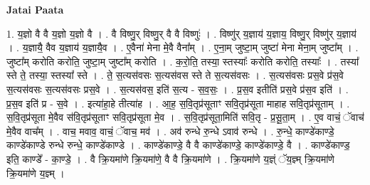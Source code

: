 \documentclass[17pt]{extarticle}
\begin{document}
\textbf{Jatai Paata} \newline

1. य॒ज्ञो वै वै य॒ज्ञो य॒ज्ञो वै । . वै विष्णु॒र् विष्णु॒र् वै वै विष्णुः॑ । . विष्णु॑र् य॒ज्ञाय॑ य॒ज्ञाय॒ विष्णु॒र् विष्णु॑र् य॒ज्ञाय॑ । . य॒ज्ञायै॒ वैव य॒ज्ञाय॑ य॒ज्ञायै॒व । . ए॒वैना॑ मेना मे॒वै वैना᳚म् । . ए॒ना॒म् जुष्टा॒म् जुष्टा॑ मेना मेना॒म् जुष्टा᳚म् । . जुष्टा᳚म् करोति करोति॒ जुष्टा॒म् जुष्टा᳚म् करोति । . क॒रो॒ति॒ तस्या॒ स्तस्याः᳚ करोति करोति॒ तस्याः᳚ । . तस्या᳚ स्ते ते॒ तस्या॒ स्तस्या᳚ स्ते । . ते॒ स॒त्यस॑वसः स॒त्यस॑वस स्ते ते स॒त्यस॑वसः । . स॒त्यस॑वसः प्रस॒वे प्र॑स॒वे स॒त्यस॑वसः स॒त्यस॑वसः प्रस॒वे । . स॒त्यस॑वस॒ इति॑ स॒त्य - स॒व॒सः॒ । . प्र॒स॒व इतीति॑ प्रस॒वे प्र॑स॒व इति॑ । . प्र॒स॒व इति॑ प्र - स॒वे । . इत्या॑हा॒हे तीत्या॑ह । . आ॒ह॒ स॒वि॒तृप्र॑सूताꣳ सवि॒तृप्र॑सूता माहाह सवि॒तृप्र॑सूताम् । . स॒वि॒तृप्र॑सूता मे॒वैव स॑वि॒तृप्र॑सूताꣳ सवि॒तृप्र॑सूता मे॒व । . स॒वि॒तृप्र॑सूता॒मिति॑ सवि॒तृ - प्र॒सू॒ता॒म् । . ए॒व वाचं॒ ॅवाच॑ मे॒वैव वाच᳚म् । . वाच॒ मवाव॒ वाचं॒ ॅवाच॒ मव॑ । . अव॑ रुन्धे रु॒न्धे ऽवाव॑ रुन्धे । . रु॒न्धे॒ काण्डे॑काण्डे॒ काण्डे॑काण्डे रुन्धे रुन्धे॒ काण्डे॑काण्डे । . काण्डे॑काण्डे॒ वै वै काण्डे॑काण्डे॒ काण्डे॑काण्डे॒ वै । . काण्डे॑काण्ड॒ इति॒ काण्डे᳚ - का॒ण्डे॒ । . वै क्रि॒यमा॑णे क्रि॒यमा॑णे॒ वै वै क्रि॒यमा॑णे । . क्रि॒यमा॑णे य॒ज्ञ्ं ॅय॒ज्ञ्म् क्रि॒यमा॑णे क्रि॒यमा॑णे य॒ज्ञ्म् । \newline
\end{document}
